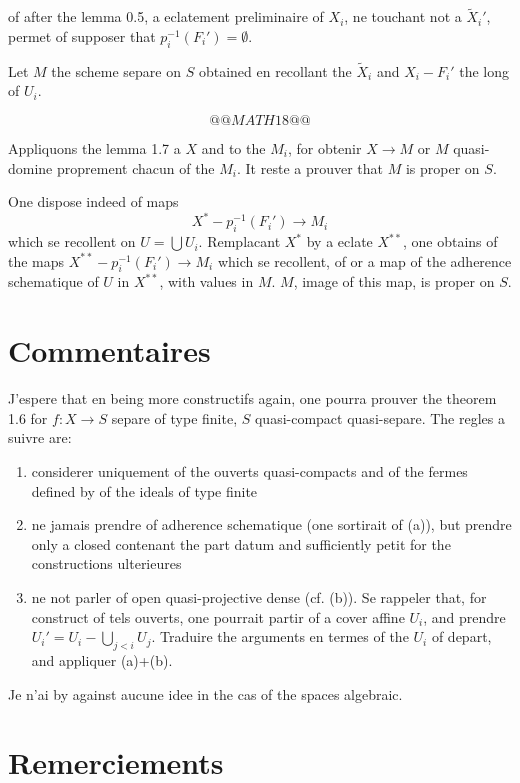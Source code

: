 \documentclass[11pt,a4paper]{article}
\theoremstyle{plain}
\theoremstyle{definition}
\begin{document}
of after the lemma 0.5, a eclatement preliminaire of $X_i$, ne touchant not a $\widetilde{X}_i'$, permet of supposer that $p_i^{-1}(F_i') = \emptyset$.

Let $M$ the scheme separe on $S$ obtained en recollant the $\widetilde{X}_i$ and $X_i - F_i'$ the long of $U_i$.

\[
@@MATH18@@
\]

Appliquons the lemma 1.7 a $X$ and to the $M_i$, for obtenir $X \to M$ or $M$ quasi-domine proprement chacun of the $M_i$. It reste a prouver that $M$ is proper on $S$.

One dispose indeed of maps
\[
X^* - p_i^{-1}(F_i') \to M_i
\]
which se recollent on $U = \bigcup U_i$. Remplacant $X^*$ by a eclate $X^{**}$, one obtains of the maps $X^{**} - p_i^{-1}(F_i') \to M_i$ which se recollent, of or a map of the adherence schematique of $U$ in $X^{**}$, with values in $M$. $M$, image of this map, is proper on $S$.

\section*{Commentaires}

J'espere that en being more constructifs again, one pourra prouver the theorem 1.6 for $f: X \to S$ separe of type finite, $S$ quasi-compact quasi-separe. The regles a suivre are:
\begin{enumerate}[label=(\alph*)]
\item considerer uniquement of the ouverts quasi-compacts and of the fermes defined by of the ideals of type finite
\item ne jamais prendre of adherence schematique (one sortirait of (a)), but prendre only a closed contenant the part datum and sufficiently petit for the constructions ulterieures
\item ne not parler of open quasi-projective dense (cf. (b)). Se rappeler that, for construct of tels ouverts, one pourrait partir of a cover affine $U_i$, and prendre $U_i' = U_i - \bigcup_{j<i} U_j$. Traduire the arguments en termes of the $U_i$ of depart, and appliquer (a)+(b).
\end{enumerate}

Je n'ai by against aucune idee in the cas of the spaces algebraic.

\section*{Remerciements}
\end{document}
